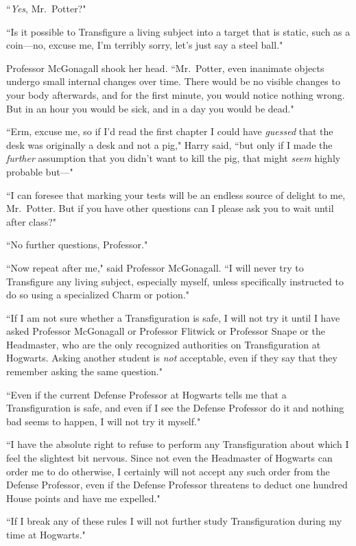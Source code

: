 ``\emph{Yes}, Mr.~Potter?"

``Is it possible to Transfigure a living subject into a target that is static, such as a coin—no, excuse me, I'm terribly sorry, let's just say a steel ball."

Professor McGonagall shook her head. ``Mr.~Potter, even inanimate objects undergo small internal changes over time. There would be no visible changes to your body afterwards, and for the first minute, you would notice nothing wrong. But in an hour you would be sick, and in a day you would be dead."

``Erm, excuse me, so if I'd read the first chapter I could have \emph{guessed} that the desk was originally a desk and not a pig," Harry said, ``but only if I made the \emph{further} assumption that you didn't want to kill the pig, that might \emph{seem} highly probable but—"

``I can foresee that marking your tests will be an endless source of delight to me, Mr.~Potter. But if you have other questions can I please ask you to wait until after class?"

``No further questions, Professor."

``Now repeat after me," said Professor McGonagall. ``I will never try to Transfigure any living subject, especially myself, unless specifically instructed to do so using a specialized Charm or potion."

``If I am not sure whether a Transfiguration is safe, I will not try it until I have asked Professor McGonagall or Professor Flitwick or Professor Snape or the Headmaster, who are the only recognized authorities on Transfiguration at Hogwarts. Asking another student is \emph{not} acceptable, even if they say that they remember asking the same question."

``Even if the current Defense Professor at Hogwarts tells me that a Transfiguration is safe, and even if I see the Defense Professor do it and nothing bad seems to happen, I will not try it myself."

``I have the absolute right to refuse to perform any Transfiguration about which I feel the slightest bit nervous. Since not even the Headmaster of Hogwarts can order me to do otherwise, I certainly will not accept any such order from the Defense Professor, even if the Defense Professor threatens to deduct one hundred House points and have me expelled."

``If I break any of these rules I will not further study Transfiguration during my time at Hogwarts."

